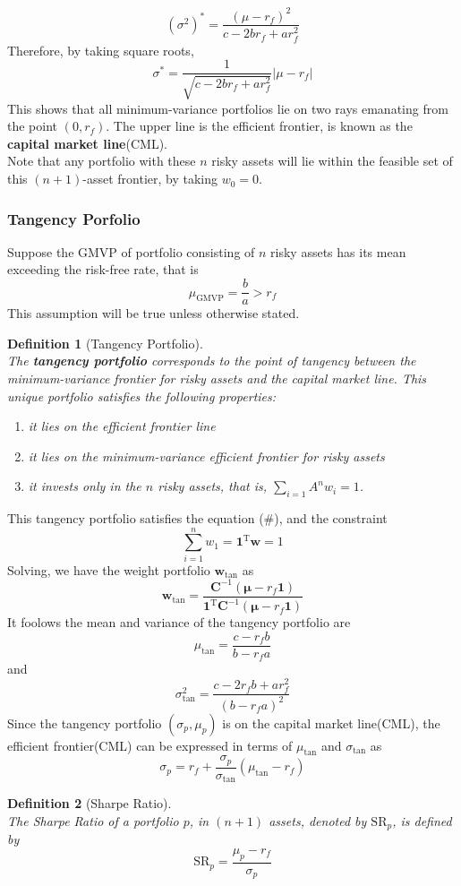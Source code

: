 \documentclass[12pt]{article}
\newtheorem{definition}{Definition}[section]
\theoremstyle{definition}
\begin{document}
\[
(\sigma^2)^\ast = \frac{(\mu-r_f)^2}{c-2br_f+ar_f^2}
\]
Therefore, by taking square roots,
\[
\sigma^\ast = \frac{1}{\sqrt{c-2br_f+ar_f^2}}|\mu-r_f|
\]
This shows that all minimum-variance portfolios lie on two rays emanating from the point $(0,r_f)$. The upper line is the efficient frontier, is known as the \textbf{capital market line}(CML).\\
Note that any portfolio with these $n$ risky assets will lie within the feasible set of this $(n+1)$-asset frontier, by taking $w_0=0$.
\subsubsection{Tangency Porfolio}
Suppose the GMVP of portfolio consisting of $n$ risky assets has its mean exceeding the risk-free rate, that is
\[
\mu_\text{GMVP}=\frac{b}{a}>r_f
\]
This assumption will be true unless otherwise stated.
\begin{definition}[Tangency Portfolio]
\hfill\\\normalfont The \textbf{tangency portfolio} corresponds to the point of tangency between the minimum-variance frontier for risky assets and the capital market line. This unique portfolio satisfies the following properties:
\begin{enumerate}
  \item it lies on the efficient frontier line
  \item it lies on the minimum-variance efficient frontier for risky assets
  \item it invests only in the $n$ risky assets, that is, $\sum_{i=1}A^n w_i=1$.
\end{enumerate}
\end{definition}
This tangency portfolio satisfies the equation (\#), and the constraint
\[
\sum_{i=1}^n w_1 = \mathbf{1}^\text{T}\mathbf{w}=1
\]
Solving, we have the weight portfolio $\mathbf{w}_\text{tan}$ as
\[
\mathbf{w}_\text{tan}=\frac{\mathbf{C}^{-1}(\bm{\mu}-r_f\mathbf{1})}{\mathbf{1}^\text{T}\mathbf{C}^{-1}(\bm{\mu}-r_f\mathbf{1})}
\]
It foolows the mean and variance of the tangency portfolio are
\[
\mu_\text{tan}=\frac{c-r_fb}{b-r_fa}
\]
and
\[
\sigma^2_\text{tan}=\frac{c-2r_fb+ar_f^2}{(b-r_fa)^2}
\]
Since the tangency portfolio $(\sigma_p,\mu_p)$ is on the capital market line(CML), the efficient frontier(CML) can be expressed in terms of $\mu_\text{tan}$ and $\sigma_\text{tan}$ as
\[
\sigma_p=r_f+\frac{\sigma_p}{\sigma_\text{tan}}(\mu_\text{tan}-r_f)
\]
\begin{definition}[Sharpe Ratio]
\hfill\\\normalfont The Sharpe Ratio of a portfolio $p$, in $(n+1)$ assets, denoted by $\text{SR}_p$, is defined by
\[
\text{SR}_p=\frac{\mu_p-r_f}{\sigma_p}
\]
\end{definition}
\end{document}
